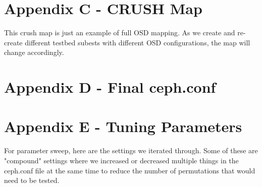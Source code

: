 \documentclass{article}
\begin{document}


\section*{Appendix C - CRUSH Map}

This crush map is just an example of full OSD mapping. As we create and
re-create different testbed subests with different OSD configurations, the map will
change accordingly.




\section*{Appendix D - Final ceph.conf}



\section*{Appendix E - Tuning Parameters}

For parameter sweep, here are the settings we iterated through.  Some of these
are "compound" settings where we increased or decreased multiple things in the
ceph.conf file at the same time to reduce the number of permutations that would
need to be tested.


\end{document}
